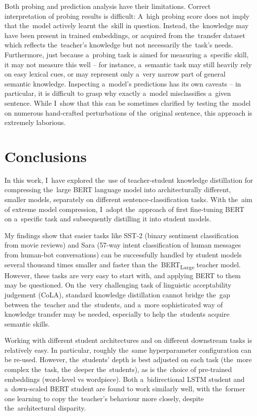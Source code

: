 \documentclass[bsc,frontabs,singlespacing,parskip,deptreport]{infthesis}
\begin{document}
{{    Both probing and prediction analysis have their limitations.
    Correct interpretation of probing results is difficult: A~high probing score does not imply that the~model actively learnt the~skill in question. 
    Instead, the~knowledge may have been present in trained embeddings, or acquired from the~transfer dataset which reflects the~teacher's knowledge but not necessarily the~task's needs.
    Furthermore, just because a~probing task is aimed for measuring a~specific skill, it may not measure this well -- for instance, a~semantic task may still heavily rely on easy lexical cues, or may represent only a~very narrow part of general semantic knowledge.
    Inspecting a~model's predictions has its own caveats -- in particular, it is difficult to grasp why exactly a~model misclassifies a~given sentence.
    While I~show that this can be sometimes clarified by testing the~model on numerous hand-crafted perturbations of the~original sentence, this approach is extremely laborious.
  }

  \section{Conclusions}{
    In this work, I~have explored the~use of teacher-student knowledge distillation for compressing the~large BERT language model into architecturally different, smaller models, separately on different sentence-classification tasks.
    With the~aim of extreme model compression, I~adopt the~approach of first fine-tuning BERT on a~specific task and subsequently distilling it into student models.

    My findings show that easier tasks like SST-2 (binary sentiment classification from movie reviews) and Sara (57-way intent classification of human messages from human-bot conversations) can be successfully handled by student models several thousand times smaller and faster than the~BERT\textsubscript{Large} teacher model.
    However, these tasks are very easy to start with, and applying BERT to them may be questioned.
    On the~very challenging task of linguistic acceptability judgement (CoLA), standard knowledge distillation cannot bridge the~gap between the~teacher and the~students, and a~more sophisticated way of knowledge transfer may be needed, especially to help the~students acquire semantic skills.

    Working with different student architectures and on different downstream tasks is relatively easy.
    In particular, roughly the~same hyperparameter configuration can be re-used.
    However, the~students' depth is best adjusted on each task (the~more complex the~task, the~deeper the~students), as is the~choice of pre-trained embeddings (word-level vs wordpiece).
    Both a~bidirectional LSTM student and a~down-scaled BERT student are found to work similarly well, with the~former one learning to copy the~teacher's behaviour more closely, despite the~architectural disparity.

}}
\end{document}
